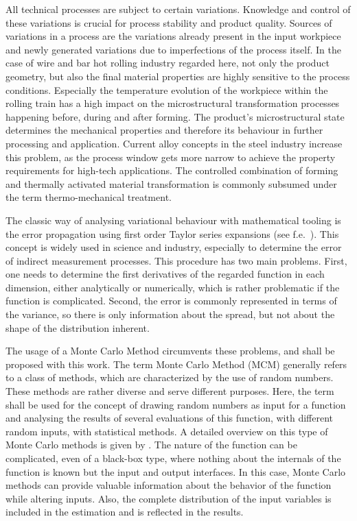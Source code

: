 All technical processes are subject to certain variations.
Knowledge and control of these variations is crucial for process stability and product quality.
Sources of variations in a process are the variations already present in the input workpiece and newly generated variations due to imperfections of the process itself.
In the case of wire and bar hot rolling industry regarded here, not only the product geometry, but also the final material properties are highly sensitive to the process conditions.
Especially the temperature evolution of the workpiece within the rolling train has a high impact on the microstructural transformation processes happening before, during and after forming.
The product's microstructural state determines the mechanical properties and therefore its behaviour in further processing and application.
Current alloy concepts in the steel industry increase this problem, as the process window gets more narrow to achieve the property requirements for high-tech applications.
The controlled combination of forming and thermally activated material transformation is commonly subsumed under the term thermo-mechanical treatment.

The classic way of analysing variational behaviour with mathematical tooling is the error propagation using first order Taylor series expansions (see f.e.~\cite{Ku1966}).
This concept is widely used in science and industry, especially to determine the error of indirect measurement processes.
This procedure has two main problems.
First, one needs to determine the first derivatives of the regarded function in each dimension, either analytically or numerically, which is rather problematic if the function is complicated.
Second, the error is commonly represented in terms of the variance, so there is only information about the spread, but not about the shape of the distribution inherent.

The usage of a Monte Carlo Method circumvents these problems, and shall be proposed with this work.
The term Monte Carlo Method (MCM) generally refers to a class of methods, which are characterized by the use of random numbers.
These methods are rather diverse and serve different purposes.
Here, the term shall be used for the concept of drawing random numbers as input for a function and analysing the results of several evaluations of this function, with different random inputs, with statistical methods.
A detailed overview on this type of Monte Carlo methods is given by \textcite{Lemieux2009}.
The nature of the function can be complicated, even of a black-box type, where nothing about the internals of the function is known but the input and output interfaces.
In this case, Monte Carlo methods can provide valuable information about the behavior of the function while altering inputs.
Also, the complete distribution of the input variables is included in the estimation and is reflected in the results.

